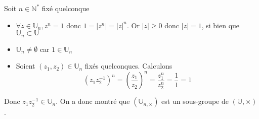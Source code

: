 \documentclass{article}
\begin{document}
Soit $n \in \mathbb{N}^{*}$ fixé quelconque
\begin{itemize}[label=$\star$]
	\item $\forall z \in \mathbb{U}_{n}, z^{n} = 1$ donc $1 = \lvert  z^{n} \rvert = \lvert z \rvert^{n}$. Or $\lvert z \rvert \geqslant 0$ donc $\lvert z \rvert = 1$, si bien que $\mathbb{U}_{n} \subset \mathbb{U}$

	\item $\mathbb{U}_{n} \neq \emptyset$ car $1 \in \mathbb{U}_{n}$

	\item Soient $(z_{1}, z_{2}) \in \mathbb{U}_{n}$ fixés quelconques.
	      Calculons
	      $$
		      (z_{1}z_{2}^{-1})^{n} = \left( \frac{z_{1}}{z_{2}} \right)^{n} = \frac{z_{1}^{n}}{z_{2}^{n}} = \frac{1}{1} = 1
	      $$
\end{itemize}
Donc $z_{1}z_{2}^{-1} \in \mathbb{U}_{n}$. On a donc montré que $(\mathbb{U}_{n, \times})$ est un sous-groupe de $(\mathbb{U}, \times)$.
\end{document}
